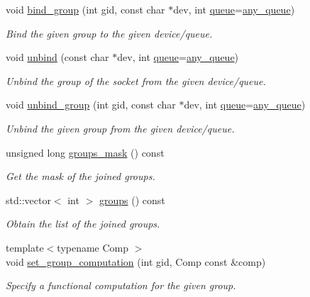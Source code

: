 \begin{DoxyCompactItemize}
void \hyperlink{classnet_1_1pfq_a2b8310320db5d583625d67eaae8be047}{bind\-\_\-group} (int gid, const char $\ast$dev, int \hyperlink{classnet_1_1queue}{queue}=\hyperlink{classnet_1_1pfq_a0d4eca6d0925b7c49365675c9cf9385c}{any\-\_\-queue})
\begin{DoxyCompactList}\small\item\em Bind the given group to the given device/queue. \end{DoxyCompactList}\item 
void \hyperlink{classnet_1_1pfq_a769e03c88c5cda30f14e67a7a398aac3}{unbind} (const char $\ast$dev, int \hyperlink{classnet_1_1queue}{queue}=\hyperlink{classnet_1_1pfq_a0d4eca6d0925b7c49365675c9cf9385c}{any\-\_\-queue})
\begin{DoxyCompactList}\small\item\em Unbind the group of the socket from the given device/queue. \end{DoxyCompactList}\item 
void \hyperlink{classnet_1_1pfq_a3bbc9de1354d5cd3e99804e55618a1a3}{unbind\-\_\-group} (int gid, const char $\ast$dev, int \hyperlink{classnet_1_1queue}{queue}=\hyperlink{classnet_1_1pfq_a0d4eca6d0925b7c49365675c9cf9385c}{any\-\_\-queue})
\begin{DoxyCompactList}\small\item\em Unbind the given group from the given device/queue. \end{DoxyCompactList}\item 
unsigned long \hyperlink{classnet_1_1pfq_a37b9270cf29bb67a4b4e577646b39a78}{groups\-\_\-mask} () const 
\begin{DoxyCompactList}\small\item\em Get the mask of the joined groups. \end{DoxyCompactList}\item 
std\-::vector$<$ int $>$ \hyperlink{classnet_1_1pfq_af63de1f94a492284cfed78695f2e93ec}{groups} () const 
\begin{DoxyCompactList}\small\item\em Obtain the list of the joined groups. \end{DoxyCompactList}\item 
{\footnotesize template$<$typename Comp $>$ }\\void \hyperlink{classnet_1_1pfq_af434441b7c824c81e3888f771b70e023}{set\-\_\-group\-\_\-computation} (int gid, Comp const \&comp)
\begin{DoxyCompactList}\small\item\em Specify a functional computation for the given group. \end{DoxyCompactList}\item 

\end{DoxyCompactItemize}
